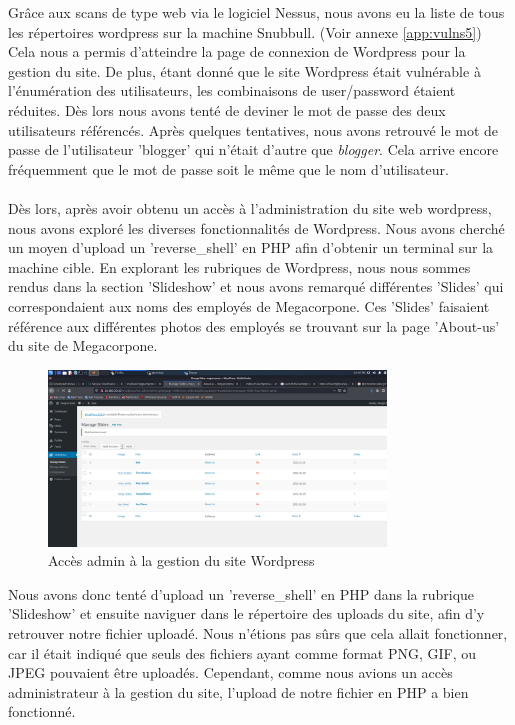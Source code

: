 \documentclass[a4paper]{article}
\begin{document}
Grâce aux scans de type web via le logiciel Nessus, nous avons eu la liste de tous les répertoires wordpress sur la machine Snubbull. (Voir annexe \ref{app:vulns5})\\
Cela nous a permis d'atteindre la page de connexion de Wordpress pour la gestion du site. De plus, étant donné que le site Wordpress était vulnérable à l'énumération des utilisateurs, les combinaisons de user/password étaient réduites. Dès lors nous avons tenté de deviner le mot de passe des deux utilisateurs référencés. Après quelques tentatives, nous avons retrouvé le mot de passe de l'utilisateur 'blogger' qui n'était d'autre que \emph{blogger}. Cela arrive encore fréquemment que le mot de passe soit le même que le nom d'utilisateur.\\\\
Dès lors, après avoir obtenu un accès à l'administration du site web wordpress, nous avons exploré les diverses fonctionnalités de Wordpress. Nous avons cherché un moyen d'upload un 'reverse\_shell' en PHP afin d'obtenir un terminal sur la machine cible. En explorant les rubriques de Wordpress, nous nous sommes rendus dans la section 'Slideshow' et nous avons remarqué différentes 'Slides' qui correspondaient aux noms des employés de Megacorpone. Ces 'Slides' faisaient référence aux différentes photos des employés se trouvant sur la page 'About-us' du site de Megacorpone.\\

\begin{figure}[H]
    \centering
    \includegraphics[width=0.8\textwidth]{images/lab4/wordpress_upload.png}
    \caption{Accès admin à la gestion du site Wordpress}
    \label{fig:wordpress}
\end{figure}

Nous avons donc tenté d'upload un 'reverse\_shell' en PHP dans la rubrique 'Slideshow' et ensuite naviguer dans le répertoire des uploads du site, afin d'y retrouver notre fichier uploadé. Nous n'étions pas sûrs que cela allait fonctionner, car il était indiqué que seuls des fichiers ayant comme format PNG, GIF, ou JPEG pouvaient être uploadés. Cependant, comme nous avions un accès administrateur à la gestion du site, l'upload de notre fichier en PHP a bien fonctionné. \cite{7}\\
\end{document}

